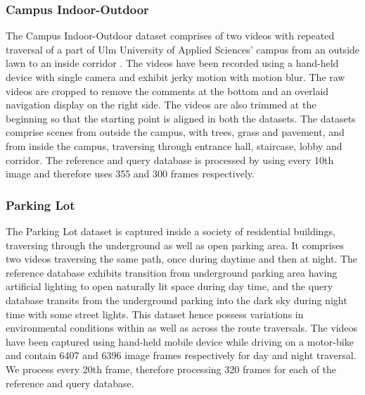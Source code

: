 \documentclass[letterpaper, 10 pt, conference]{ieeeconf}  %
\begin{document}
\subsubsection{Campus Indoor-Outdoor}
The Campus Indoor-Outdoor dataset comprises of two videos with repeated traversal of a part of Ulm University of Applied Sciences' campus from an outside lawn to an inside corridor \cite{indoorOutdoor1}. The videos have been recorded using a hand-held device with single camera and exhibit jerky motion with motion blur. The raw videos are cropped to remove the comments at the bottom and an overlaid navigation display on the right side. The videos are also trimmed at the beginning so that the starting point is aligned in both the datasets. The datasets comprise scenes from outside the campus, with trees, grass and pavement, and from inside the campus, traversing through entrance hall, staircase, lobby and corridor. The reference and query database is processed by using every 10th image and therefore uses 355 and 300 frames respectively.

\subsubsection{Parking Lot}
The Parking Lot dataset is captured inside a society of residential buildings, traversing through the underground as well as open parking area. It comprises two videos traversing the same path, once during daytime and then at night. The reference database exhibits transition from underground parking area having artificial lighting to open naturally lit space during day time, and the query database transits from the underground parking into the dark sky during night time with some street lights. This dataset hence possess variations in environmental conditions within as well as across the route traversals. The videos have been captured using hand-held mobile device while driving on a motor-bike and contain 6407 and 6396 image frames respectively for day and night traversal. We process every 20th frame, therefore processing 320 frames for each of the reference and query database.
\end{document}
